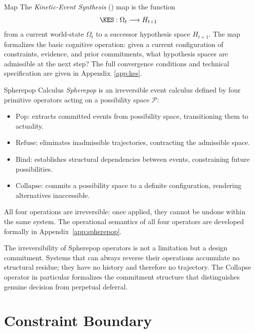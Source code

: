 \begin{definition}{\KES Map}
The \emph{Kinetic-Event Synthesis} (\KES) map is the function
\[
  \KES: \Omega_t \longrightarrow H_{t+1}
\]
from a current world-state $\Omega_t$ to a successor hypothesis space $H_{t+1}$.
The map formalizes the basic cognitive operation: given a current configuration of
constraints, evidence, and prior commitments, what hypothesis spaces are admissible
at the next step? The full convergence conditions and technical specification are
given in Appendix~\ref{app:kes}.
\end{definition}

\begin{definition}{Spherepop Calculus}
\emph{Spherepop} is an irreversible event calculus defined by four primitive
operators acting on a possibility space $\mathcal{P}$:
\begin{itemize}
  \item $\mathrm{Pop}$: extracts committed events from possibility space,
        transitioning them to actuality.
  \item $\mathrm{Refuse}$: eliminates inadmissible trajectories, contracting the
        admissible space.
  \item $\mathrm{Bind}$: establishes structural dependencies between events,
        constraining future possibilities.
  \item $\mathrm{Collapse}$: commits a possibility space to a definite
        configuration, rendering alternatives inaccessible.
\end{itemize}
All four operations are irreversible: once applied, they cannot be undone within
the same system. The operational semantics of all four operators are developed
formally in Appendix~\ref{app:spherepop}.
\end{definition}

\begin{remark}
The irreversibility of Spherepop operators is not a limitation but a design
commitment. Systems that can always reverse their operations accumulate no
structural residue; they have no history and therefore no trajectory. The
Collapse operator in particular formalizes the commitment structure that
distinguishes genuine decision from perpetual deferral.
\end{remark}

\section*{Constraint Boundary}

